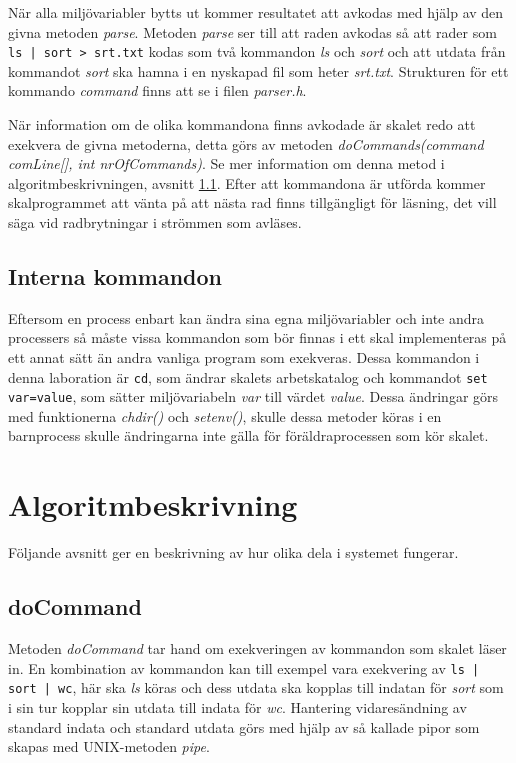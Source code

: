 \documentclass[a4paper, 12pt]{article}
\begin{document}
När alla miljövariabler bytts ut kommer resultatet att avkodas med
hjälp av den givna metoden \textit{parse}. Metoden \textit{parse} ser
till att raden avkodas så att rader som \verb!ls | sort > srt.txt!
kodas som två kommandon \textit{ls} och \textit{sort} och att utdata
från kommandot \textit{sort} ska hamna i en nyskapad fil som heter
\textit{srt.txt}. Strukturen för ett kommando \textit{command} finns
att se i filen \textit{parser.h}.

När information om de olika kommandona finns avkodade är skalet redo
att exekvera de givna metoderna, detta görs av metoden
\textit{doCommands(command comLine[], int nrOfCommands)}. Se mer
information om denna metod i algoritmbeskrivningen, avsnitt
\ref{sec:doCommand}. Efter att kommandona är utförda kommer
skalprogrammet att vänta på att nästa rad finns tillgängligt för
läsning, det vill säga vid radbrytningar i strömmen som avläses.

\subsection{Interna kommandon}\label{sec:internakommandon}
Eftersom en process enbart kan ändra sina egna miljövariabler och inte
andra processers så måste vissa kommandon som bör finnas i ett skal
implementeras på ett annat sätt än andra vanliga program som
exekveras. Dessa kommandon i denna laboration är \verb!cd!, som ändrar
skalets arbetskatalog och kommandot \verb!set var=value!, som sätter
miljövariabeln \textit{var} till värdet \textit{value}. Dessa
ändringar görs med funktionerna \textit{chdir()} och
\textit{setenv()}, skulle dessa metoder köras i en barnprocess skulle
ändringarna inte gälla för föräldraprocessen som kör skalet.

\section{Algoritmbeskrivning}\label{sec:algoritmbeskrivning}
Följande avsnitt ger en beskrivning av hur olika dela i systemet
fungerar.

\subsection{doCommand}\label{sec:doCommand}
Metoden \textit{doCommand} tar hand om exekveringen av kommandon som
skalet läser in. En kombination av kommandon kan till exempel vara
exekvering av \verb!ls | sort | wc!, här ska \textit{ls} köras och dess
utdata ska kopplas till indatan för \textit{sort} som i sin tur
kopplar sin utdata till indata för \textit{wc}. Hantering
vidaresändning av standard indata och standard utdata görs med hjälp
av så kallade pipor som skapas med UNIX-metoden \textit{pipe}.
\end{document}
